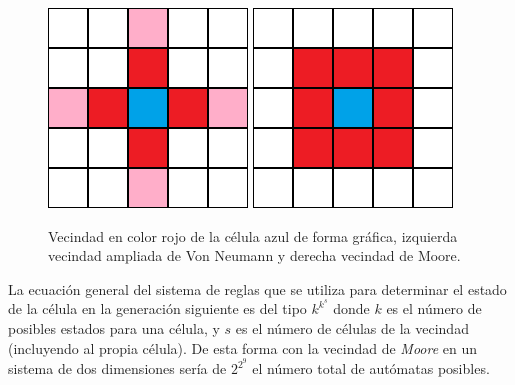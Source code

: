 \begin{figure}[H]
\centering
\includegraphics[scale=0.5]{imagenes/CA_Neumann.png}
\hspace{2cm}
\includegraphics[scale=0.5]{imagenes/CA-Moore.png}
\caption{Vecindad en color rojo de la célula azul de forma gráfica, izquierda vecindad ampliada de Von Neumann y derecha vecindad de Moore.}
\label{fig:vecindad}

\end{figure}

La ecuación general del sistema de reglas que se utiliza para determinar el estado de la célula en la generación siguiente es del tipo $k^{k^s}$ donde $k$ es el número de posibles estados para una célula, y $s$ es el número de células de la vecindad (incluyendo al propia célula). De esta forma con la vecindad de \textit{Moore} en un sistema de dos dimensiones sería de $2^{2^9}$ el número total de autómatas posibles.\\

